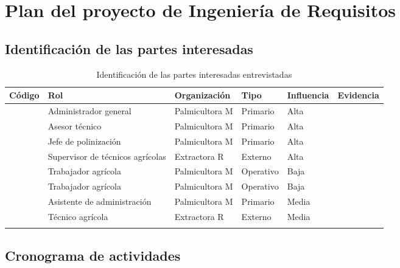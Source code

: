 
\newpage
\appendix
\section{Plan del proyecto de Ingeniería de Requisitos}

\subsection{Identificación de las partes interesadas}

\begin{longtable}{|C{1.6cm}|L{4.4cm}|C{1.8cm}|C{1.6cm}|C{1.6cm}|C{2.6cm}|}
\hline
{}\textbf{Código} & \textbf{Rol} & \textbf{Organización} & \textbf{Tipo} & \textbf{Influencia} & \textbf{Evidencia} \\
\hline
\endhead
{} & Administrador general & Palmicultora M & Primario & Alta &  \\ \hline
{} & Asesor técnico & Palmicultora M & Primario & Alta &  \\ \hline
{} & Jefe de polinización & Palmicultora M & Primario & Alta &  \\ \hline
{} & Supervisor de técnicos agrícolas & Extractora R & Externo & Alta &  \\ \hline
{} & Trabajador agrícola & Palmicultora M & Operativo & Baja &  \\ \hline
{} & Trabajador agrícola & Palmicultora M & Operativo & Baja &  \\ \hline
{} & Asistente de administración & Palmicultora M & Primario & Media &  \\ \hline
{} & Técnico agrícola & Extractora R & Externo & Media &  \\ \hline
\caption{Identificación de las partes interesadas entrevistadas}
\end{longtable}

\subsection{Cronograma de actividades}

